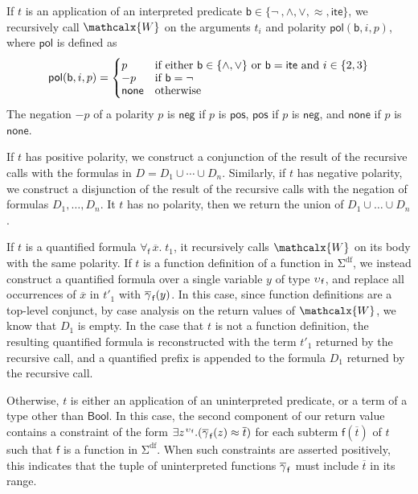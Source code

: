 \documentclass[runningheads,a4paper]{llncs}
\newcommand\pneg{-}
\newcommand{\con}[1]{\mathsf{#1}}
\renewcommand\vec[1]{\overline{#1}}
\let\oldSigma=\Sigma
\def\Sigma{\mathrm{\oldSigma}}
\let\oldneg=\neg
\def\neg{\oldneg\:}
\newcommand{\teq}{\approx}
\newcommand{\conv}{\mathcalx{W}}
\newcommand{\sfundefs}[1]{#1^\mathrm{df}}
\newcommand{\pnone}{\con{none}}
\newcommand{\ptrue}{\con{pos}}
\newcommand{\pfalse}{\con{neg}}
\newcommand{\pol}{\con{pol}}
\newcommand{\Bool}{\con{Bool}}
\newcommand{\lite}{\con{ite}}
\newcommand\concret{\gamma} %
\newcommand{\boolop}{\con{b}}
\newcommand{\forallf}[1]{\forall_{\!#1\:}}
\newcommand{\vecfarg}[1]{\vec{\concret}_{\vthinspace#1}}
\newcommand{\fargsort}[1]{\upsilon_{\vthinspace#1}}
\newcommand{\vthinspace}{\kern+0.083333em}
\newcommand{\typ}[1]{^{\vthinspace #1}}
\begin{document}
If $t$ is an application of an interpreted predicate $\boolop
\in \{{\neg}, {\land}, {\lor}, {\teq}, {\lite}\}$,
we recursively call $\conv$ on the arguments $t_i$ and polarity $\pol( \boolop,
i, p )$, where $\pol$ is defined as
\begin{equation*}
\pol( \boolop, i, p ) =
\begin{cases}
p & \text{if either $\boolop \in \{{\land}, {\lor}\}$ or $\boolop = \lite$ and $i \in \{2, 3\}$} \\[-\jot]
\pneg p & \text{if $\boolop = {\neg}$} \\[-\jot]
\pnone & \text{otherwise}
\end{cases}
\end{equation*}
The negation $\pneg p$ of a polarity $p$ is $\pfalse$ if $p$ is $\ptrue$, $\ptrue$
if $p$ is $\pfalse$, and $\pnone$ if $p$ is $\pnone$.

If $t$ has positive polarity, we construct a conjunction of the result of the
recursive calls with the formulas in $D = D_1 \mathrel\cup \cdots \mathrel\cup
D_n$. Similarly, if $t$ has negative polarity, we construct a disjunction of
the result of the recursive calls with the negation of formulas $D_1, \ldots,
D_n$. It $t$ has no polarity, then we return the union of $D_1 \cup \ldots \cup
D_n$.

If $t$ is a quantified formula $\forallf{\con{f}} \vec x.\; t_1$, it
recursively calls $\conv$ on its body with the same polarity. If $t$ is a
function definition of a function in $\sfundefs{\Sigma}$, we instead construct
a quantified formula over a single variable $y$ of type $\fargsort{\con{f}}$,
and replace all occurrences of $\vec x$ in $t'_1$ with $\vecfarg{\con{f}}( y )$.
In this case, since function definitions are a top-level conjunct, by case
analysis on the return values of $\conv$, we know that $D_1$ is empty. In the
case that $t$ is not a function definition, the resulting quantified formula is
reconstructed with the term $t'_1$ returned by the recursive call, and a
quantified prefix is appended to the formula $D_1$ returned by the recursive
call.

Otherwise, $t$ is either an application of an uninterpreted predicate, or a
term of a type other than $\Bool$. In this case, the second component of our
return value contains a constraint of the form $\exists
z\typ{\fargsort{\con{f}}}. ( \vecfarg{\con{f}}( z ) \teq \vec t )$ for each
subterm $\con{f}( \vec t )$ of $t$ such that $\con{f}$ is a function in
$\sfundefs{\Sigma}$. When such constraints are asserted positively, this
indicates that the tuple of uninterpreted functions $\vecfarg{\con{f}}$ must
include $\vec t$ in its range.
\end{document}
